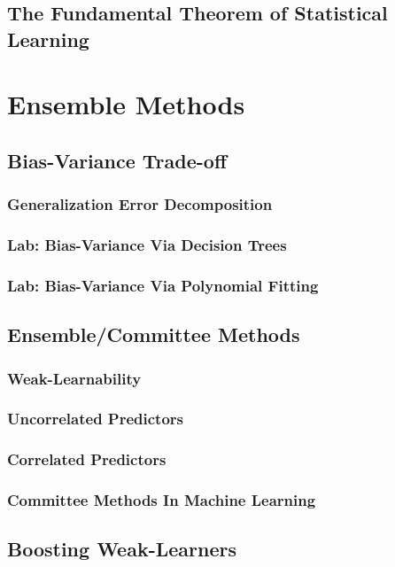 \documentclass[11pt,fleqn]{book} %
\begin{document}
    \section{The Fundamental Theorem of Statistical Learning}
    
\chapter{Ensemble Methods}
    \section{Bias-Variance Trade-off}
        \subsection{Generalization Error Decomposition}
        \subsection{Lab: Bias-Variance Via Decision Trees}
        \subsection{Lab: Bias-Variance Via Polynomial Fitting}
        
    \section{Ensemble/Committee Methods}
        \subsection{Weak-Learnability}
        \subsection{Uncorrelated Predictors}
        \subsection{Correlated Predictors}
        \subsection{Committee Methods In Machine Learning}
    
    \section{Boosting Weak-Learners}
\end{document}
